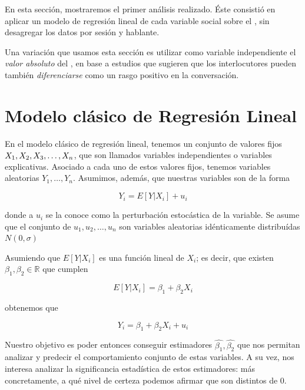 En esta sección, mostraremos el primer análisis realizado. Éste consistió en aplicar un modelo de regresión lineal de cada variable social sobre el \entrainment, sin desagregar los datos por sesión y hablante.

Una variación que usamos esta sección es utilizar como variable independiente el \emph{valor absoluto} del \entrainment, en base a estudios que sugieren que los interlocutores pueden también \emph{diferenciarse} como un rasgo positivo en la conversación.

\section{Modelo clásico de Regresión Lineal}

En el modelo clásico de regresión lineal, tenemos un conjunto de valores fijos $X_1, X_2, \\ X_3, \ldots, X_n$, que son llamados variables independientes o variables explicativas. Asociado a cada uno de estos valores fijos, tenemos variables aleatorias $Y_1, \ldots, Y_n$. Asumimos, además, que nuestras variables son de la forma

\begin{equation}
  Y_i = E[Y|X_i] + u_i
\end{equation}

\noindent donde a $u_i$ se la conoce como la perturbación estocástica de la variable. Se asume que el conjunto de $u_1, u_2, \ldots, u_n$ son variables aleatorias idénticamente distribuídas $N(0, \sigma)$

Asumiendo que $E[Y|X_i]$ es una función lineal de $X_i$; es decir, que existen $\beta_1, \beta_2 \in \mathbb{R}$ que cumplen

\begin{equation}
  E[Y|X_i] = \beta_1 + \beta_2 X_i
\end{equation}

\noindent obtenemos que

\begin{equation}
  Y_i = \beta_1 + \beta_2 X_i + u_i
\end{equation}

Nuestro objetivo es poder entonces conseguir estimadores $\widehat{\beta_1}, \widehat{\beta_2}$ que nos permitan analizar y predecir el comportamiento conjunto de estas variables. A su vez, nos interesa analizar la significancia estadística de estos estimadores: más concretamente, a qué nivel de certeza podemos afirmar que son distintos de 0.


